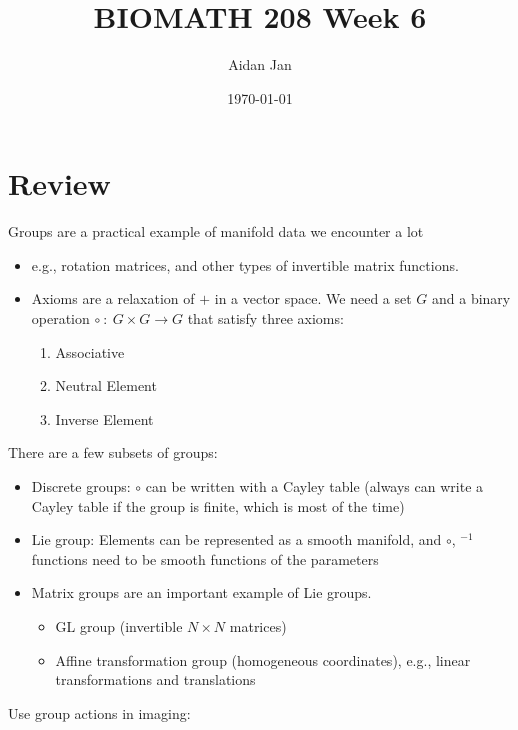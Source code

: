 \documentclass[10pt]{article}
\title{BIOMATH 208 Week 6}
\author{Aidan Jan}
\date{\today}
\begin{document}
\maketitle

\section*{Review}
Groups are a practical example of manifold data we encounter a lot
\begin{itemize}
    \item e.g., rotation matrices, and other types of invertible matrix functions.
    \item Axioms are a relaxation of $+$ in a vector space.  We need a set $G$ and a binary operation $\circ\::\: G \times G \rightarrow G$ that satisfy three axioms:
    \begin{enumerate}
        \item Associative
        \item Neutral Element
        \item Inverse Element
    \end{enumerate}
\end{itemize}
There are a few subsets of groups:
\begin{itemize}
    \item Discrete groups: $\circ$ can be written with a Cayley table (always can write a Cayley table if the group is finite, which is most of the time)
    \item Lie group: Elements can be represented as a smooth manifold, and $\circ$, $^{-1}$ functions need to be smooth functions of the parameters
    \item Matrix groups are an important example of Lie groups.
    \begin{itemize}
        \item GL group (invertible $N \times N$ matrices)
        \item Affine transformation group (homogeneous coordinates), e.g., linear transformations and translations
    \end{itemize}
\end{itemize}
Use group actions in imaging:
\end{document}
